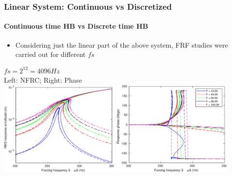 \documentclass[9pt]{beamer}
\begin{document}
\begin{frame}
  \frametitle{Linear System: Continuous vs Discretized}
  \framesubtitle{Continuous time HB vs Discrete time HB}
  \begin{itemize}
  \item Considering just the linear part of the above system, FRF
    studies were carried out for different $fs$
  \end{itemize}
  \begin{center}
    $fs = 2^{12} = 4096 Hz$\\
   Left: NFRC; Right: Phase\\
   \includegraphics[width=0.45\textwidth]{../../benchmark0/fig/dssex_frf_Amp_fs4096}
   \includegraphics[width=0.45\textwidth]{../../benchmark0/fig/dssex_frf_Phase_fs4096}
  \end{center}  
\end{frame}
\end{document}
